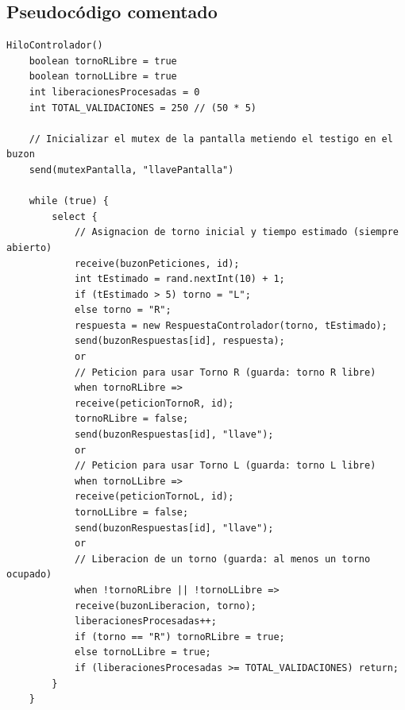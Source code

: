 \documentclass[12pt,a4paper]{article}
\begin{document}
\subsection{Pseudocódigo comentado}
\begin{lstlisting}[language={}, caption={Pseudocódigo HiloControlador}]
HiloControlador()
    boolean tornoRLibre = true
    boolean tornoLLibre = true
    int liberacionesProcesadas = 0
    int TOTAL_VALIDACIONES = 250 // (50 * 5)

    // Inicializar el mutex de la pantalla metiendo el testigo en el buzon
    send(mutexPantalla, "llavePantalla")

    while (true) {
        select {
            // Asignacion de torno inicial y tiempo estimado (siempre abierto)
            receive(buzonPeticiones, id);
            int tEstimado = rand.nextInt(10) + 1;
            if (tEstimado > 5) torno = "L";
            else torno = "R";
            respuesta = new RespuestaControlador(torno, tEstimado);
            send(buzonRespuestas[id], respuesta);
            or
            // Peticion para usar Torno R (guarda: torno R libre)
            when tornoRLibre =>
            receive(peticionTornoR, id);
            tornoRLibre = false;
            send(buzonRespuestas[id], "llave");
            or
            // Peticion para usar Torno L (guarda: torno L libre)
            when tornoLLibre =>
            receive(peticionTornoL, id);
            tornoLLibre = false;
            send(buzonRespuestas[id], "llave");
            or
            // Liberacion de un torno (guarda: al menos un torno ocupado)
            when !tornoRLibre || !tornoLLibre =>
            receive(buzonLiberacion, torno);
            liberacionesProcesadas++;
            if (torno == "R") tornoRLibre = true;
            else tornoLLibre = true;
            if (liberacionesProcesadas >= TOTAL_VALIDACIONES) return;
        }
    }
\end{lstlisting}
\end{document}
